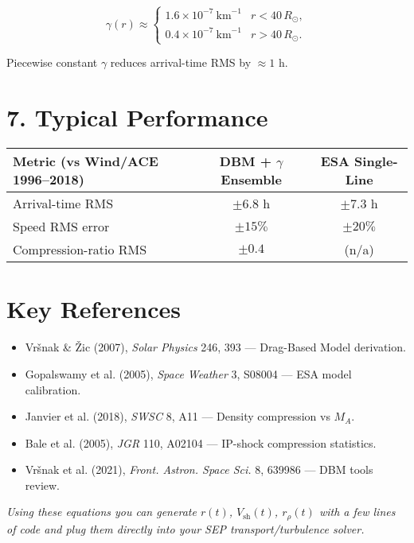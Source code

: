 \[
\gamma(r) \approx
\begin{cases}
1.6 \times 10^{-7}\ \text{km}^{-1} & r < 40\,R_\odot,\\
0.4 \times 10^{-7}\ \text{km}^{-1} & r > 40\,R_\odot.
\end{cases}
\]

Piecewise constant $\gamma$ reduces arrival-time RMS by $\approx 1$ h.

\hrulefill

\section*{7. Typical Performance}

\begin{center}
\begin{tabular}{@{}lcc@{}}
\toprule
\textbf{Metric (vs Wind/ACE 1996–2018)} & \textbf{DBM + $\gamma$ Ensemble} & \textbf{ESA Single-Line} \\
\midrule
Arrival-time RMS & $\pm 6.8$ h & $\pm 7.3$ h \\
Speed RMS error  & $\pm 15\%$  & $\pm 20\%$ \\
Compression-ratio RMS & $\pm 0.4$ & (n/a) \\
\bottomrule
\end{tabular}
\end{center}

\hrulefill

\section*{Key References}

\begin{itemize}
\item Vršnak \& Žic (2007), \textit{Solar Physics} 246, 393 — Drag-Based Model derivation.
\item Gopalswamy et al. (2005), \textit{Space Weather} 3, S08004 — ESA model calibration.
\item Janvier et al. (2018), \textit{SWSC} 8, A11 — Density compression vs $M_A$.
\item Bale et al. (2005), \textit{JGR} 110, A02104 — IP-shock compression statistics.
\item Vršnak et al. (2021), \textit{Front. Astron. Space Sci.} 8, 639986 — DBM tools review.
\end{itemize}

\textit{Using these equations you can generate $r(t)$, $V_{\text{sh}}(t)$, $r_{\rho}(t)$ with a few lines of code and plug them directly into your SEP transport/turbulence solver.}






